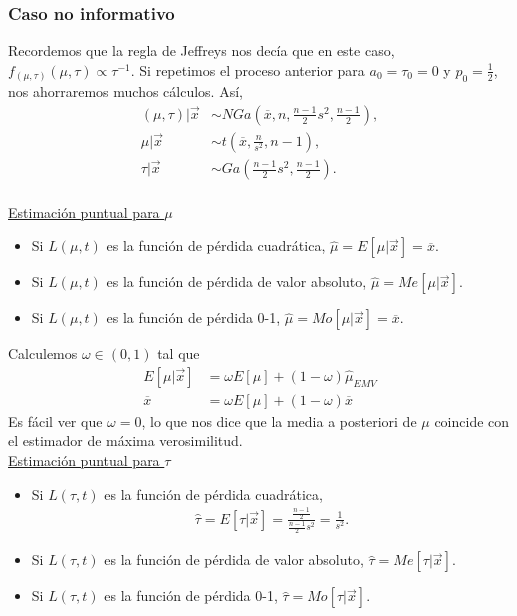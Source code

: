 \subsubsection{Caso no informativo}
\noindent Recordemos que la regla de Jeffreys nos decía que en este caso, $f_{(\mu,\tau)}(\mu,\tau) \propto \tau^{-1}$. Si repetimos el proceso anterior para $a_0 = \tau_0 = 0$ y $p_0 = \frac{1}{2}$, nos ahorraremos muchos cálculos. Así,
\begin{align*}
    (\mu,\tau) | \vec{x} & \sim NGa\left( \overline{x}, n, \frac{n-1}{2}s^2, \frac{n-1}{2}\right), \\
    \mu | \vec{x} & \sim t \left( \overline{x}, \frac{n}{s^2},n-1 \right), \\
    \tau | \vec{x} & \sim Ga\left( \frac{n-1}{2}s^2, \frac{n-1}{2} \right).
\end{align*}
\\
\newline
\noindent \underline{Estimación puntual para $\mu$}
\begin{itemize}
    \item Si $L(\mu,t)$ es la función de pérdida cuadrática, $\widehat{\mu} = E[\mu |  \vec{x}] = \overline{x}$.
    \item Si $L(\mu,t)$ es la función de pérdida de valor absoluto, $\widehat{\mu} = Me[\mu |  \vec{x}]$.
    \item Si $L(\mu,t)$ es la función de pérdida 0-1, $ \widehat{\mu} = Mo[\mu |  \vec{x}] = \overline{x}$.
\end{itemize}
Calculemos $\omega \in (0,1)$ tal que 
\begin{align*}
    E[\mu  | \vec{x}] &= \omega E[\mu]  + (1 - \omega) \widehat{\mu }_{EMV} \\
    \overline{x} &= \omega E[\mu] + (1 - \omega) \overline{x}
\end{align*}
Es fácil ver que $\omega = 0$, lo que nos dice que la media a posteriori de $\mu$ coincide con el estimador de máxima verosimilitud.
\\
\newline
\noindent \underline{Estimación puntual para $\tau$}
\begin{itemize}
    \item Si $L(\tau,t)$ es la función de pérdida cuadrática,
    \begin{align*}
        \widehat{\tau} = E[\tau |  \vec{x}] = \frac{\frac{n-1}{2}}{\frac{n-1}{2}s^2} = \frac{1}{s^2}.
    \end{align*}
    \item Si $L(\tau,t)$ es la función de pérdida de valor absoluto, $\widehat{\tau} = Me[\tau |  \vec{x}]$.
    \item Si $L(\tau,t)$ es la función de pérdida 0-1, $ \widehat{\tau} = Mo[\tau |  \vec{x}]$.
\end{itemize}
